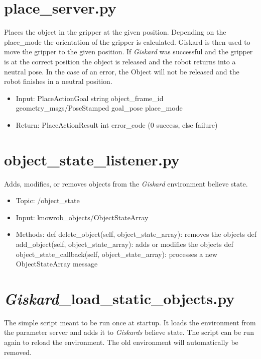 \documentclass[main.tex]{subfiles}
\begin{document}
			
			\section{place\_server.py}  
			Places the object in the gripper at the given position. Depending on the place\_mode the orientation of the gripper is calculated. Giskard is then used to move the gripper to the given position. If \textit{Giskard} was successful and the gripper is at the correct position the object is released and the robot returns into a neutral pose. In the case of an error, the Object will not be released and the robot finishes in a neutral position. 
			
			\begin{itemize}
				\item Input: PlaceActionGoal 
				\subitem string object\_frame\_id 
				\subitem geometry\_msgs/PoseStamped goal\_pose
				\subitem place\_mode
				\item Return: PlaceActionResult
				\subitem int error\_code (0 success, else failure)
			\end{itemize}
			
			\section{object\_state\_listener.py} 
			Adds, modifies, or removes objects from the \textit{Giskard} environment believe state.
			
			\begin{itemize}
				\item Topic: /object\_state
				\item Input: knowrob\_objects/ObjectStateArray
				\item Methods:
				\subitem def delete\_object(self, object\_state\_array): removes the objects
				\subitem def add\_object(self, object\_state\_array): adds or modifies the objects
				\subitem def object\_state\_callback(self, object\_state\_array): processes a new ObjectStateArray message
			\end{itemize}
			
			\section{\textit{Giskard}\_load\_static\_objects.py} 
			The simple script meant to be run once at startup. It loads the environment from the parameter server and adds it to \textit{Giskards} believe state. 
			The script can be run again to reload the environment. The old environment will automatically be removed.
			
\end{document}
